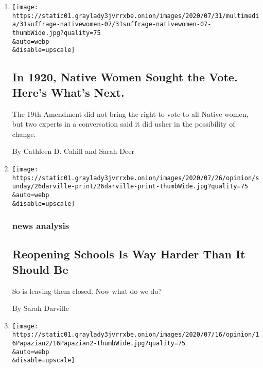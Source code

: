 \begin{enumerate}
\def\labelenumi{\arabic{enumi}.}
\item
  \href{/2020/07/31/style/19th-amendment-native-womens-suffrage.html}{}

  \texttt{[image: https://static01.graylady3jvrrxbe.onion/images/2020/07/31/multimedia/31suffrage-nativewomen-07/31suffrage-nativewomen-07-thumbWide.jpg?quality=75\\\&auto=webp\\\&disable=upscale]}

  \hypertarget{in-1920-native-women-sought-the-vote-heres-whats-next}{%
  \subsection{In 1920, Native Women Sought the Vote. Here's What's
  Next.}\label{in-1920-native-women-sought-the-vote-heres-whats-next}}

  The 19th Amendment did not bring the right to vote to all Native
  women, but two experts in a conversation said it did usher in the
  possibility of change.

  By Cathleen D. Cahill and Sarah Deer
\item
  \href{/2020/07/23/sunday-review/reopening-schools-coronavirus.html}{}

  \texttt{[image: https://static01.graylady3jvrrxbe.onion/images/2020/07/26/opinion/sunday/26darville-print/26darville-print-thumbWide.jpg?quality=75\\\&auto=webp\\\&disable=upscale]}

  \hypertarget{news-analysis}{%
  \subsubsection{news analysis}\label{news-analysis}}

  \hypertarget{reopening-schools-is-way-harder-than-it-should-be}{%
  \subsection{Reopening Schools Is Way Harder Than It Should
  Be}\label{reopening-schools-is-way-harder-than-it-should-be}}

  So is leaving them closed. Now what do we do?

  By Sarah Darville
\item
  \href{/2020/07/16/opinion/culture/mashrou-leila-fan-suicide.html}{}

  \texttt{[image: https://static01.graylady3jvrrxbe.onion/images/2020/07/16/opinion/16Papazian2/16Papazian2-thumbWide.jpg?quality=75\\\&auto=webp\\\&disable=upscale]}


\end{enumerate}
